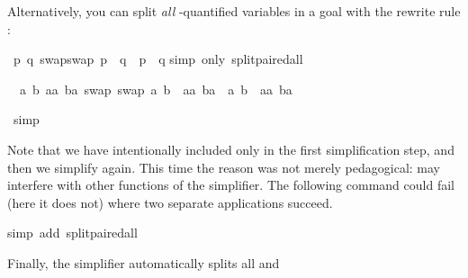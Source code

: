 \begin{isabellebody}
\begin{isamarkuptxt}
Alternatively, you can split \emph{all} \isa{{\isasymAnd}}-quantified variables
in a goal with the rewrite rule :%
\end{isamarkuptxt}%
\isamarkuptrue%
%
\endisatagproof
{\isafoldproof}%
%
\isadelimproof
%
\endisadelimproof
{}\isamarkupfalse%
\ {\isachardoublequoteopen}{\isasymAnd}p\ q{\isachardot}\ swap{\isacharparenleft}swap\ p{\isacharparenright}\ {\isacharequal}\ q\ {\isasymlongrightarrow}\ p\ {\isacharequal}\ q{\isachardoublequoteclose}\isanewline
%
\isadelimproof
%
\endisadelimproof
%
\isatagproof
{}\isamarkupfalse%
{\isacharparenleft}simp\ only{\isacharcolon}\ split{\isacharunderscore}paired{\isacharunderscore}all{\isacharparenright}%
\begin{isamarkuptxt}%
\noindent
\begin{isabelle}%
\ {}{\isachardot}\ {\isasymAnd}a\ b\ aa\ ba{\isachardot}\ swap\ {\isacharparenleft}swap\ {\isacharparenleft}a{\isacharcomma}\ b{\isacharparenright}{\isacharparenright}\ {\isacharequal}\ {\isacharparenleft}aa{\isacharcomma}\ ba{\isacharparenright}\ {\isasymlongrightarrow}\ {\isacharparenleft}a{\isacharcomma}\ b{\isacharparenright}\ {\isacharequal}\ {\isacharparenleft}aa{\isacharcomma}\ ba{\isacharparenright}%
\end{isabelle}%
\end{isamarkuptxt}%
\isamarkuptrue%
\isamarkupfalse%
\ simp\isanewline
{}\isamarkupfalse%
%
\endisatagproof
{\isafoldproof}%
%
\isadelimproof
%
\endisadelimproof
%
\begin{isamarkuptext}%
\noindent
Note that we have intentionally included only 
in the first simplification step, and then we simplify again. 
This time the reason was not merely
pedagogical:
 may interfere with other functions
of the simplifier.
The following command could fail (here it does not)
where two separate  applications succeed.%
\end{isamarkuptext}%
\isamarkuptrue%
%
\isadelimproof
%
\endisadelimproof
%
\isatagproof
{}\isamarkupfalse%
{\isacharparenleft}simp\ add{\isacharcolon}\ split{\isacharunderscore}paired{\isacharunderscore}all{\isacharparenright}%
\endisatagproof
{\isafoldproof}%
%
\isadelimproof
%
\endisadelimproof
%
\begin{isamarkuptext}%
\noindent
Finally, the simplifier automatically splits all \isa{{\isasymforall}} and

\end{isamarkuptext}
\end{isabellebody}
